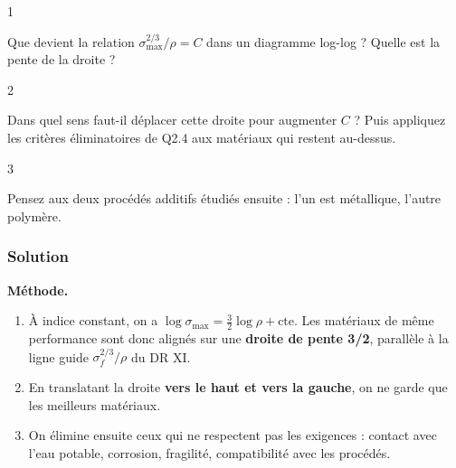 \documentclass[11pt,a4paper]{article}
\providecommand{\tightlist}{\setlength{\itemsep}{0pt}\setlength{\parskip}{0pt}}
\begin{document}
\begin{indication}{1}

Que devient la relation \(\sigma_{\max}^{2/3}/\rho = C\) dans un diagramme log-log ? Quelle est la pente de la droite ?

\end{indication}

\begin{indication}{2}

Dans quel sens faut-il déplacer cette droite pour augmenter \(C\) ? Puis appliquez les critères éliminatoires de Q2.4 aux matériaux qui restent au-dessus.

\end{indication}

\begin{indication}{3}

Pensez aux deux procédés additifs étudiés ensuite : l'un est métallique, l'autre polymère.

\end{indication}

\hypertarget{solution-20}{%
\subsubsection{Solution}\label{solution-20}}

\textbf{Méthode.}

\begin{enumerate}
\def\labelenumi{\arabic{enumi}.}
\tightlist
\item
  À indice constant, on a \(\log\sigma_{\max} = \frac32\log\rho + \text{cte}\). Les matériaux de même performance sont donc alignés sur une \textbf{droite de pente 3/2}, parallèle à la ligne guide \(\sigma_f^{2/3}/\rho\) du DR XI.
\item
  En translatant la droite \textbf{vers le haut et vers la gauche}, on ne garde que les meilleurs matériaux.
\item
  On élimine ensuite ceux qui ne respectent pas les exigences : contact avec l'eau potable, corrosion, fragilité, compatibilité avec les procédés.
\end{enumerate}
\end{document}
